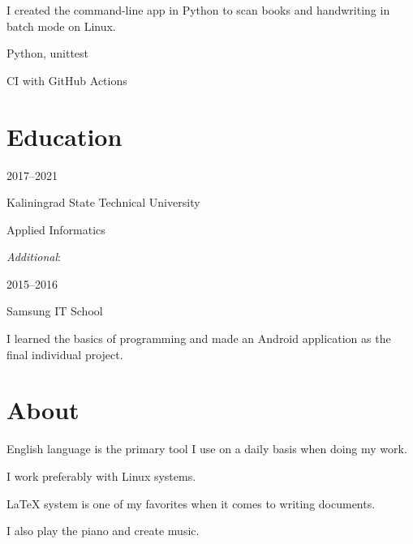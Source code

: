 \documentclass [12pt] {article}
\begin{document}
I created the command-line app in Python to scan books and handwriting in
batch mode on Linux.

\medskip

Python, unittest

CI with GitHub Actions

\section {Education}

2017--2021

Kaliningrad State Technical University

Applied Informatics

\bigskip

\emph {Additional}:

2015--2016

Samsung IT School

I learned the basics of programming
and made an Android application as the final individual project.

\section {About}

English language is the primary tool
I use on a daily basis when doing my work.

I work preferably with Linux systems.

LaTeX system is one of my favorites
when it comes to writing documents.

I also play the piano and create music.
\end{document}
